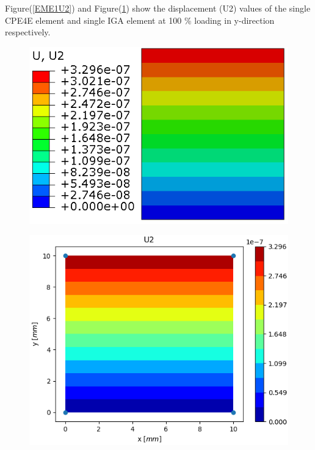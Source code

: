\documentclass[11pt]{article}
\begin{document}
\noindent
Figure(\ref{EME1U2}) and Figure(\ref{EME1U2_IGA}) show the displacement (U2) values of the single CPE4E element and single IGA element at 100 \% loading in y-direction respectively. \\
\begin{figure}[H]
	\centering
	\begin{minipage}{.5\textwidth}
		\centering
		\includegraphics[width=1\linewidth]{EME1U2.png}
		\label{EME1U2}
	\end{minipage}%
	\begin{minipage}{.5\textwidth}
		\centering
		\includegraphics[width=1\linewidth]{EME1U2_IGA.png}
		\label{EME1U2_IGA}
	\end{minipage}
\end{figure}
\end{document}

